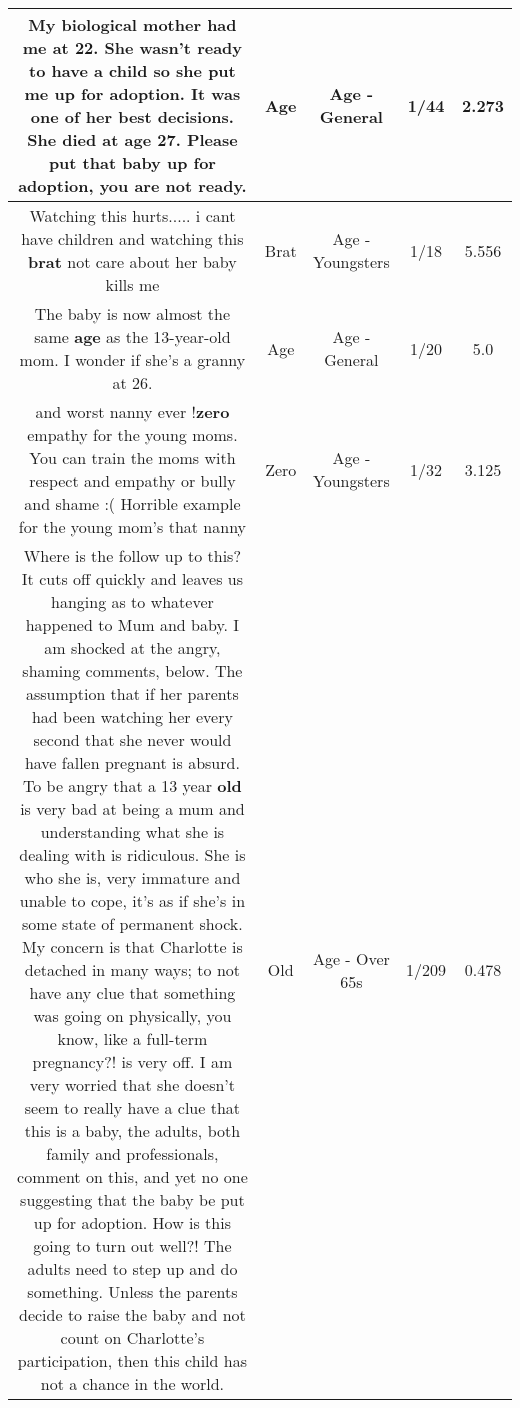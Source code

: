 \documentclass[11pt]{article}
\newlength\mylength
\begin{document}
\begin{center}
\begin{longtable}{|C{.65\mylength}|C{.30\mylength}|C{.12\mylength}|C{.12\mylength}|C{.12\mylength}|}
  \small My biological mother had me at 22. She wasn't ready to have a child so she put me up for adoption. It was one of her best decisions. She died at \textbf{age} 27. Please put that baby up for adoption, you are not ready.\normalsize   & Age & Age - General & 1/44 & 2.273 \\  \hline
  \small Watching this hurts..... i cant have children and watching this \textbf{brat} not care about her baby kills me\normalsize   & Brat & Age - Youngsters & 1/18 & 5.556 \\  \hline
  \small The baby is now almost the same \textbf{age} as the 13-year-old mom. I wonder if she's a granny at 26.\normalsize   & Age & Age - General & 1/20 & 5.0 \\  \hline
  \small and worst nanny ever !\textbf{zero} empathy for the young moms. You can train the moms with respect and empathy or bully and shame :( Horrible example for the young mom's that nanny\normalsize   & Zero & Age - Youngsters & 1/32 & 3.125 \\  \hline
  \small Where is the follow up to this?  It cuts off quickly and leaves us hanging as to whatever happened to Mum and baby.  I am shocked at the angry, shaming comments, below.  The assumption that if her parents had been watching her every second that she never would have fallen pregnant is absurd.  To be angry that a 13 year \textbf{old} is very bad at being a mum and understanding what she is dealing with is ridiculous.   She is who she is, very immature and unable to cope, it's as if she's in some state of permanent shock.  My concern is that Charlotte is detached in many ways; to not have any clue that something was going on physically, you know, like a full-term pregnancy?! is very off.  I am very worried that she doesn't seem to really have a clue that this is a baby, the adults, both family and professionals, comment on this, and yet no one suggesting that the baby be put up for adoption.  How is this going to turn out well?!  The adults need to step up and do something.  Unless the parents decide to raise the baby and not count on Charlotte's participation, then this child has not a chance in the world.\normalsize   & Old & Age - Over 65s & 1/209 & 0.478 \\  \hline

\end{longtable}
\end{center}
\end{document}
